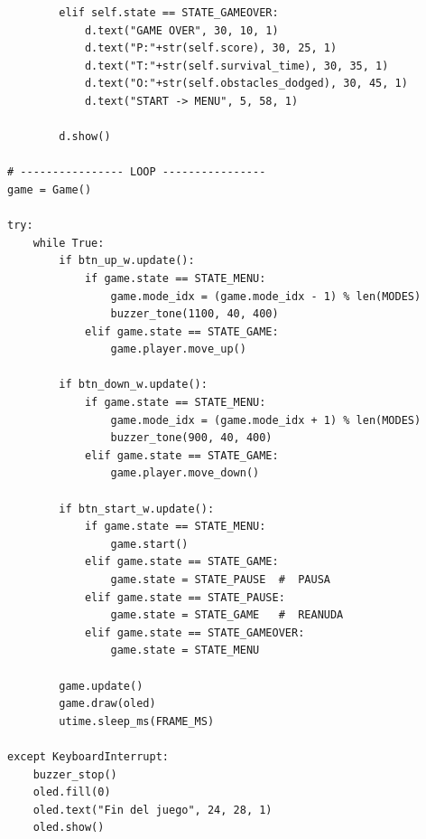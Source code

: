 \documentclass[12pt]{article}
\begin{document}
\begin{lstlisting}
        elif self.state == STATE_GAMEOVER:
            d.text("GAME OVER", 30, 10, 1)
            d.text("P:"+str(self.score), 30, 25, 1)
            d.text("T:"+str(self.survival_time), 30, 35, 1)
            d.text("O:"+str(self.obstacles_dodged), 30, 45, 1)
            d.text("START -> MENU", 5, 58, 1)

        d.show()

# ---------------- LOOP ----------------
game = Game()

try:
    while True:
        if btn_up_w.update():
            if game.state == STATE_MENU:
                game.mode_idx = (game.mode_idx - 1) % len(MODES)
                buzzer_tone(1100, 40, 400)
            elif game.state == STATE_GAME:
                game.player.move_up()

        if btn_down_w.update():
            if game.state == STATE_MENU:
                game.mode_idx = (game.mode_idx + 1) % len(MODES)
                buzzer_tone(900, 40, 400)
            elif game.state == STATE_GAME:
                game.player.move_down()

        if btn_start_w.update():
            if game.state == STATE_MENU:
                game.start()
            elif game.state == STATE_GAME:
                game.state = STATE_PAUSE  #  PAUSA
            elif game.state == STATE_PAUSE:
                game.state = STATE_GAME   #  REANUDA
            elif game.state == STATE_GAMEOVER:
                game.state = STATE_MENU

        game.update()
        game.draw(oled)
        utime.sleep_ms(FRAME_MS)

except KeyboardInterrupt:
    buzzer_stop()
    oled.fill(0)
    oled.text("Fin del juego", 24, 28, 1)
    oled.show()
\end{lstlisting}
\end{document}
